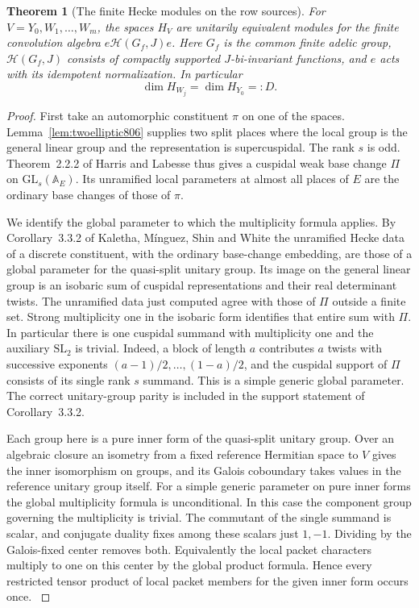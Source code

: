 \documentclass[a4paper,11pt]{article}
\newtheorem{theorem}[proposition]{Theorem}
\theoremstyle{definition}
\theoremstyle{remark}
\numberwithin{equation}{section}
\begin{document}
\begin{theorem}[The finite Hecke modules on the row sources]
\leavevmode\label{thm:commonsource806}
For \(V=Y_0,W_1,\ldots,W_m\), the spaces \(H_V\) are unitarily
equivalent modules for the finite convolution algebra
\(e\mathcal H(G_f,J)e\). Here \(G_f\) is the common finite
adelic group, \(\mathcal H(G_f,J)\) consists of compactly
supported \(J\)-bi-invariant functions, and \(e\) acts with
its idempotent normalization. In particular
\[
                         \dim H_{W_j}=\dim H_{Y_0}=:D .
\]
\end{theorem}
\begin{proof}
First take an automorphic constituent \(\pi\) on one of the
spaces. Lemma~\ref{lem:twoelliptic806} supplies two split
places where the local group is the general linear group and
the representation is supercuspidal. The rank \(s\) is odd.
Theorem~2.2.2 of Harris and Labesse thus gives a cuspidal weak
base change \(\Pi\) on \(\mathrm{GL}_s(\mathbb A_E)\). Its
unramified local parameters at almost all places of \(E\)
are the ordinary base changes of those of \(\pi\).
\cite{XIV-XI-harrislabesse806}

We identify the global parameter to which the multiplicity
formula applies. By Corollary~3.3.2 of Kaletha, M\'inguez,
Shin and White the unramified Hecke data of a discrete
constituent, with the ordinary base-change embedding, are
those of a global parameter for the quasi-split unitary
group. Its image on the general linear group is an isobaric
sum of cuspidal representations and their real determinant
twists. The unramified data just computed agree with those
of \(\Pi\) outside a finite set. Strong multiplicity one
in the isobaric form identifies that entire sum with \(\Pi\).
In particular there is one cuspidal summand with multiplicity
one and the auxiliary \(\mathrm{SL}_2\) is trivial. Indeed, a
block of length \(a\) contributes \(a\) twists with successive
exponents \((a-1)/2,\ldots,(1-a)/2\), and the cuspidal
support of \(\Pi\) consists of its single rank \(s\) summand.
This is a simple generic global parameter. The correct
unitary-group parity is included in the support statement of
Corollary~3.3.2. \cite[\S\S1.3.2, 3.3]{XIV-XI-innerunitary806}

Each group here is a pure inner form of the quasi-split
unitary group. Over an algebraic closure an isometry from a
fixed reference Hermitian space to \(V\) gives the inner
isomorphism on groups, and its Galois coboundary takes values
in the reference unitary group itself. For a simple generic
parameter on pure inner forms the global multiplicity formula
is unconditional. In this case the component group governing
the multiplicity is trivial. The commutant of the single
summand is scalar, and conjugate duality fixes among these
scalars just \(1,-1\). Dividing by the Galois-fixed center
removes both. Equivalently the local packet characters multiply
to one on this center by the global product formula. Hence
every restricted tensor product of local packet members for
the given inner form occurs once. \cite[\S1.7, Theorem~1.7.1
and the paragraph following it]{XIV-XI-innerunitary806}


\end{proof}
\end{document}
